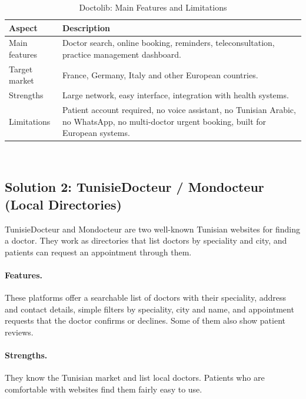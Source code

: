 \begin{table}[H]
    \centering
    \caption{Doctolib: Main Features and Limitations}
    \label{tab:doctolib}
    \small
    \begin{tabular}{>{\raggedright\arraybackslash}p{\dimexpr 0.3571\dimexpr\textwidth-4\tabcolsep\relax\relax}>{\raggedright\arraybackslash}p{\dimexpr 0.6429\dimexpr\textwidth-4\tabcolsep\relax\relax}}
        \toprule
        \textbf{Aspect} & \textbf{Description} \\
        \midrule
        Main features & Doctor search, online booking, reminders, teleconsultation, practice management dashboard. \\
        Target market & France, Germany, Italy and other European countries. \\
        Strengths & Large network, easy interface, integration with health systems. \\
        Limitations & Patient account required, no voice assistant, no Tunisian Arabic, no WhatsApp, no multi-doctor urgent booking, built for European systems. \\
        \bottomrule
    \end{tabular}
    \\[0.2cm]
\end{table}

\subsection{Solution 2: TunisieDocteur / Mondocteur (Local Directories)}
TunisieDocteur and Mondocteur are two well-known Tunisian websites for finding a doctor. They work as directories that list doctors by speciality and city, and patients can request an appointment through them.

\paragraph{Features.} These platforms offer a searchable list of doctors with their speciality, address and contact details, simple filters by speciality, city and name, and appointment requests that the doctor confirms or declines. Some of them also show patient reviews.

\paragraph{Strengths.} They know the Tunisian market and list local doctors. Patients who are comfortable with websites find them fairly easy to use.

